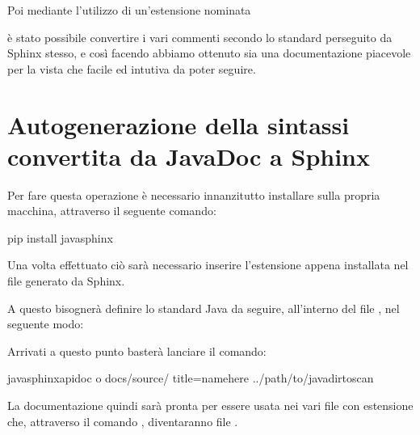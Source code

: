 \documentclass[letterpaper,10pt,italian,openany,oneside]{sphinxmanual}
\begin{document}
Poi mediante l’utilizzo di un’estensione nominata  %
\begin{footnote}[3]\sphinxAtStartFootnote
{}
%
\end{footnote} è stato possibile
convertire i vari commenti  secondo lo standard perseguito da Sphinx stesso, e così
facendo abbiamo ottenuto sia una documentazione piacevole per la vista che
facile ed intutiva da poter seguire.


\section{Autogenerazione della sintassi convertita da JavaDoc a Sphinx}
\label{\detokenize{sphinx:autogenerazione-della-sintassi-convertita-da-javadoc-a-sphinx}}
Per fare questa operazione è necessario innanzitutto installare 
sulla propria macchina, attraverso il seguente comando:

\begin{sphinxVerbatim}[commandchars=\\\{\}]
\PYGZdl{} pip install javasphinx
\end{sphinxVerbatim}

Una volta effettuato ciò sarà necessario inserire l’estensione  appena installata
nel file  generato da Sphinx.

A questo bisognerà definire lo standard Java da seguire, all’interno del file
, nel seguente modo:


Arrivati a questo punto basterà lanciare il comando:

\begin{sphinxVerbatim}[commandchars=\\\{\}]
\PYGZdl{} javasphinx\PYGZhy{}apidoc \PYGZhy{}o docs/source/ \PYGZhy{}\PYGZhy{}title=\PYGZsq{}\PYGZlt{}name\PYGZus{}here\PYGZgt{}\PYGZsq{} ../path/to/java\PYGZus{}dirtoscan
\end{sphinxVerbatim}

La documentazione quindi sarà pronta per essere usata nei vari file con estensione  che, attraverso il comando , diventaranno file .
\end{document}
